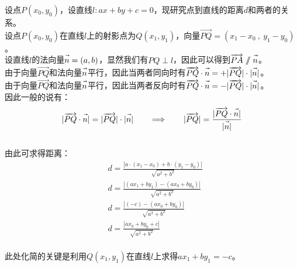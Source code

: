 \documentclass[UTF8]{ctexart}
\let\nvec\vec
\def\vec#1{\nvec{\vphantom b\smash{#1}}}
\renewcommand\parallel{{\hspace{3.0pt}\mathrel{/\mskip-6.5mu/}\hspace{2.6pt}}}
\begin{document}
    设点$P(x_0,y_0)$，设直线$l:ax+by+c=0$，现研究点到直线的距离$d$和两者的关系。\\[3mm]
    设点$P(x_0,y_0)$在直线$l$上的射影点为$Q(x_1,y_1)$，向量$\overrightarrow{PQ}=(x_1-x_0~,~y_1-y_0)$。\\[3mm]
    设直线$l$的法向量$\vec{n}=(a,b)$，显然我们有$PQ\perp l$，因此可以得到$\overrightarrow{PA}\parallel\vec{n}$。\\[6mm]
    由于向量$\overrightarrow{PQ}$和法向量$\vec{n}$平行，因此当两者同向时有$\overrightarrow{PQ}\cdot\vec{n}=+|\overrightarrow{PQ}|\cdot|\vec{n}|$。\\[3mm]
    由于向量$\overrightarrow{PQ}$和法向量$\vec{n}$平行，因此当两者反向时有$\overrightarrow{PQ}\cdot\vec{n}=-|\overrightarrow{PQ}|\cdot|\vec{n}|$。\\[3mm]
    因此一般的说有：
    \begin{align}
        |\overrightarrow{PQ}\cdot\vec{n}|=|\overrightarrow{PQ}|\cdot|\vec{n}|~~~~~~\Longrightarrow~~~~~~|\overrightarrow{PQ}|=\frac{|\overrightarrow{PQ}\cdot\vec{n}|}{|\vec{n}|}
    \end{align}\\
    由此可求得距离：
    \begin{align}
        &d=\frac{|a\cdot(x_1-x_0)+b\cdot(y_1-y_0)|}{\sqrt{a^2+b^2}}\\[2mm]
        &d=\frac{|(ax_1+by_1)-(ax_0+by_0)|}{\sqrt{a^2+b^2}}\\[2mm]
        &d=\frac{|(-c)-(ax_0+by_0)|}{\sqrt{a^2+b^2}}\\[2mm]
        &d=\frac{|ax_0+by_0+c|}{\sqrt{a^2+b^2}}
    \end{align}\\
    此处化简的关键是利用$Q(x_1,y_1)$在直线$l$上求得$ax_1+by_1=-c$。

\newpage
\end{document}
